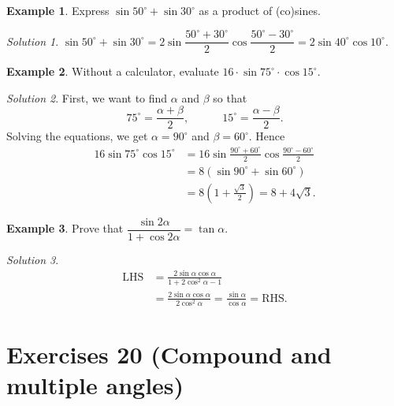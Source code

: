 \documentclass[
  12pt,
  oneside]{book}
\theoremstyle{definition}
\theoremstyle{definition}
\newtheorem{example}{Example}[chapter]
\theoremstyle{definition}
\theoremstyle{definition}
\theoremstyle{remark}
\newtheorem*{solution}{Solution}
\begin{document}
\begin{example}
Express \(\sin50^\circ + \sin30^\circ\) as a product of (co)sines.
\end{example}

\begin{solution}
\(\sin50^\circ+\sin30^\circ = 2\sin\dfrac{50^\circ+30^\circ}{2}\cos\dfrac{50^\circ-30^\circ}{2} = 2\sin 40^\circ\cos 10^\circ\).
\end{solution}

\begin{example}
Without a calculator, evaluate \(16\cdot\sin75^\circ\cdot \cos15^\circ\).
\end{example}

\begin{solution}
First, we want to find \(\alpha\) and \(\beta\) so that
\[
75^\circ=\frac{\alpha+\beta}{2}, \quad\quad\quad
15^\circ=\frac{\alpha-\beta}{2}.
\]
Solving the equations, we get \(\alpha=90^\circ\) and \(\beta=60^\circ\). Hence
\begin{align*}
16\sin 75^\circ\cos15^\circ &= 16\sin\frac{90^\circ+60^\circ}{2}\cos\frac{90^\circ-60^\circ}{2}\\
&= 8(\sin90^\circ+\sin60^\circ)\\
&= 8\left(1+\frac{\sqrt3}{2}\right) = 8 + 4\sqrt{3}.
\end{align*}
\end{solution}

\begin{example}
Prove that \(\dfrac{\sin2\alpha}{1+\cos2\alpha}=\tan\alpha\).
\end{example}

\begin{solution}
\begin{align*}
\mathrm{LHS} &=
\frac{2\sin\alpha\cos\alpha}{1+2\cos^2\alpha -1}\\
&= \frac{2\sin\alpha\cos\alpha}{2\cos^2\alpha} = \frac{\sin\alpha}{\cos\alpha} = \mathrm{RHS}.
\end{align*}
\end{solution}

\chapter*{Exercises 20 (Compound and multiple angles)}\label{exercises-20-compound-and-multiple-angles}
\end{document}
